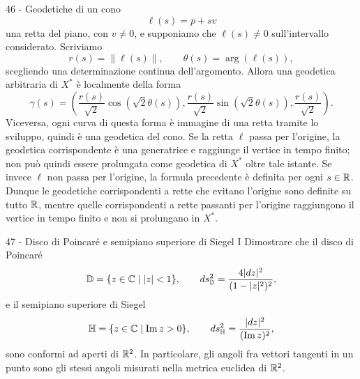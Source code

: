 \documentclass[a4paper]{article}
\begin{document}
\begin{snippetsolution}{46 - Geodetiche di un cono}
    \[
        \ell(s)=p+sv
    \]
    una retta del piano, con \(v\neq0\), e supponiamo che \(\ell(s)\neq0\) sull'intervallo considerato. Scriviamo
    \[
        r(s)=\|\ell(s)\|,
        \qquad
        \theta(s)=\arg(\ell(s)),
    \]
    scegliendo una determinazione continua dell'argomento. Allora una geodetica arbitraria di \(X^*\) è localmente della forma
    \[
        \gamma(s)=
        \left(
            \frac{r(s)}{\sqrt{2}}\cos(\sqrt{2}\theta(s)),
            \frac{r(s)}{\sqrt{2}}\sin(\sqrt{2}\theta(s)),
            \frac{r(s)}{\sqrt{2}}
        \right).
    \]
    Viceversa, ogni curva di questa forma è immagine di una retta tramite lo sviluppo, quindi è una geodetica del cono.
    Se la retta \(\ell\) passa per l'origine, la geodetica corrispondente è una generatrice e raggiunge il vertice in tempo finito; non può quindi essere prolungata come geodetica di \(X^*\) oltre tale istante. Se invece \(\ell\) non passa per l'origine, la formula precedente è definita per ogni \(s\in\mathbb{R}\). Dunque le geodetiche corrispondenti a rette che evitano l'origine sono definite su tutto \(\mathbb{R}\), mentre quelle corrispondenti a rette passanti per l'origine raggiungono il vertice in tempo finito e non si prolungano in \(X^*\).
\end{snippetsolution}

\begin{snippetexercise}{47 - Disco di Poincaré e semipiano superiore di Siegel I}
    Dimostrare che il disco di Poincaré
    \[
        \mathbb{D}
        =
        \{z\in\mathbb{C}\mid |z|<1\},
        \qquad
        ds^2_{\mathbb{D}}
        =
        \frac{4|dz|^2}{(1-|z|^2)^2},
    \]
    e il semipiano superiore di Siegel
    \[
        \mathbb{H}
        =
        \{z\in\mathbb{C}\mid \operatorname{Im}z>0\},
        \qquad
        ds^2_{\mathbb{H}}
        =
        \frac{|dz|^2}{(\operatorname{Im}z)^2},
    \]
    sono conformi ad aperti di \(\mathbb{R}^2\). In particolare, gli
    angoli fra vettori tangenti in un punto sono gli stessi angoli
    misurati nella metrica euclidea di \(\mathbb{R}^2\).
\end{snippetexercise}
\end{document}

